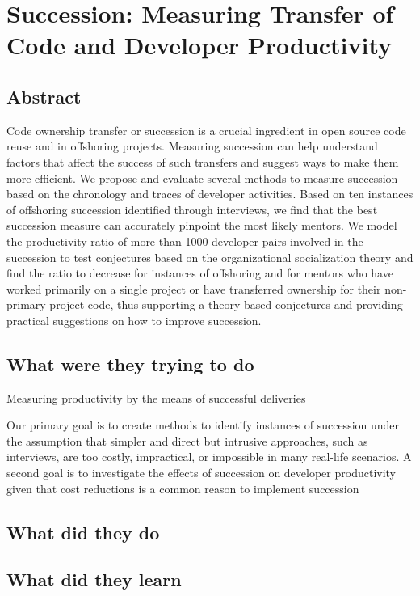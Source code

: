 \section{Succession: Measuring Transfer of Code and Developer Productivity}

\subsection{Abstract}

Code ownership transfer or succession is a crucial ingredient in open source code reuse and in offshoring projects. Measuring succession can help understand factors that affect the success of such transfers and suggest ways to make them more efficient. We propose and evaluate several methods to measure succession based on the chronology and traces of developer activities. Based on ten instances of offshoring succession identified through interviews, we find that the best succession measure can accurately pinpoint the most likely mentors. We model the productivity ratio of more than 1000 developer pairs involved in the succession to test conjectures based on the organizational socialization theory and find the ratio to decrease for instances of offshoring and for mentors who have worked primarily on a single project or have transferred ownership for their non-primary project code, thus supporting a theory-based conjectures and providing practical suggestions on how to improve succession.

\subsection{What were they trying to do}

Measuring productivity by the means of successful deliveries

Our primary goal is to create methods to identify instances of succession under the assumption that simpler and direct but intrusive approaches, such as interviews, are too costly, impractical, or impossible in many real-life scenarios. A second goal is to investigate the effects of succession on developer productivity given that cost reductions is a common reason to implement succession

\subsection{What did they do}

\subsection{What did they learn}

